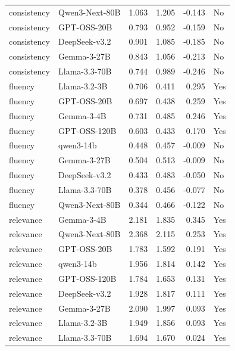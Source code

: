 \begin{table}[t]
{\begin{tabular}{llrrrl}
consistency & Qwen3-Next-80B & 1.063 & 1.205 & -0.143 & No \\
consistency & GPT-OSS-20B & 0.793 & 0.952 & -0.159 & No \\
consistency & DeepSeek-v3.2 & 0.901 & 1.085 & -0.185 & No \\
consistency & Gemma-3-27B & 0.843 & 1.056 & -0.213 & No \\
consistency & Llama-3.3-70B & 0.744 & 0.989 & -0.246 & No \\
fluency & Llama-3.2-3B & 0.706 & 0.411 & 0.295 & Yes \\
fluency & GPT-OSS-20B & 0.697 & 0.438 & 0.259 & Yes \\
fluency & Gemma-3-4B & 0.731 & 0.485 & 0.246 & Yes \\
fluency & GPT-OSS-120B & 0.603 & 0.433 & 0.170 & Yes \\
fluency & qwen3-14b & 0.448 & 0.457 & -0.009 & No \\
fluency & Gemma-3-27B & 0.504 & 0.513 & -0.009 & No \\
fluency & DeepSeek-v3.2 & 0.433 & 0.483 & -0.050 & No \\
fluency & Llama-3.3-70B & 0.378 & 0.456 & -0.077 & No \\
fluency & Qwen3-Next-80B & 0.344 & 0.466 & -0.122 & No \\
relevance & Gemma-3-4B & 2.181 & 1.835 & 0.345 & Yes \\
relevance & Qwen3-Next-80B & 2.368 & 2.115 & 0.253 & Yes \\
relevance & GPT-OSS-20B & 1.783 & 1.592 & 0.191 & Yes \\
relevance & qwen3-14b & 1.956 & 1.814 & 0.142 & Yes \\
relevance & GPT-OSS-120B & 1.784 & 1.653 & 0.131 & Yes \\
relevance & DeepSeek-v3.2 & 1.928 & 1.817 & 0.111 & Yes \\
relevance & Gemma-3-27B & 2.090 & 1.997 & 0.093 & Yes \\
relevance & Llama-3.2-3B & 1.949 & 1.856 & 0.093 & Yes \\
relevance & Llama-3.3-70B & 1.694 & 1.670 & 0.024 & Yes \\
\bottomrule
\end{tabular}
}
\end{table}